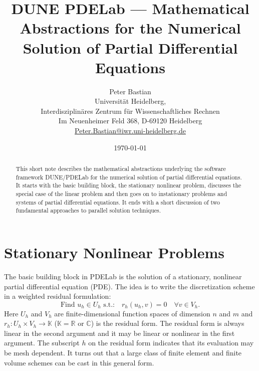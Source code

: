 \documentclass[a4paper,12pt]{article}
\title{DUNE PDELab ---
Mathematical Abstractions for the Numerical Solution of Partial Differential Equations}
\author{Peter Bastian\\
  Universität Heidelberg, \\
  Interdisziplinäres Zentrum für Wissenschaftliches Rechnen\\
  Im Neuenheimer Feld 368, D-69120 Heidelberg\\
  \url{Peter.Bastian@iwr.uni-heidelberg.de}
}
\date{\today}
\theoremstyle{definition}
\begin{document}
\maketitle

\begin{abstract}
This short note describes the mathematical abstractions underlying the
software framework DUNE/PDELab for the numerical solution of partial
differential equations. It starts with the basic building block, the
stationary nonlinear problem, discusses the special case of the linear
problem and then goes on to instationary problems and systems of partial
differential equations. It ends with a short discussion of two fundamental
approaches to parallel solution techniques.
\end{abstract}

\section{Stationary Nonlinear Problems}\label{Sec:BasicBuildingBlock}

The basic building block in PDELab is the solution of 
a stationary, nonlinear partial differential equation (PDE).
The idea is to write the discretization scheme in a weighted residual formulation:
\begin{equation}
\text{Find $u_h\in U_h$ s.t.:} \quad r_h(u_h,v)=0 \quad \forall v\in V_h.
\label{Eq:BasicBuildingBlock}
\end{equation}
Here $U_h$ and $V_h$ are finite-dimensional function spaces of dimension $n$ and $m$
and $r_h: U_h\times V_h\to\mathbb{K}$ ($\mathbb{K}=\mathbb{R}$ or 
$\mathbb{C}$) is the residual form. The residual 
form is always linear in the second argument and it may be linear or nonlinear in the first
argument. The subscript $h$ on the residual form indicates that its evaluation may be mesh dependent.
It turns out that a large class of finite element and finite volume schemes
can be cast in this general form.
\end{document}
